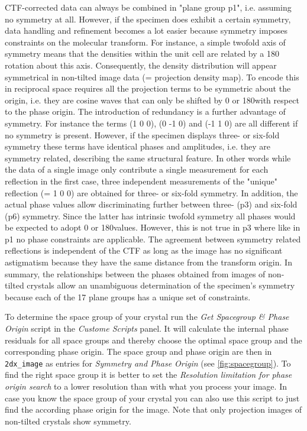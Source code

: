 CTF-corrected data can always be combined in "plane group p1", i.e. assuming no symmetry at all. However, if the specimen does exhibit a certain symmetry, data handling and refinement becomes a lot easier because symmetry imposes constraints on the molecular transform. For instance, a simple twofold axis of symmetry means that the densities within the unit cell are related by a 180\textdegree
rotation about this axis. Consequently, the density distribution will appear symmetrical in non-tilted image data (= projection density map). To encode this in reciprocal space requires all the projection terms to be symmetric about the origin, i.e. they are cosine waves that can only be shifted by 0 or 180\textdegree with respect to the phase origin.
The introduction of redundancy is a further advantage of symmetry. For instance the terms (1 0 0), (0 -1 0) and (-1 1 0) are all different if no symmetry is present. However, if the specimen displays three- or six-fold symmetry these terms have identical phases and amplitudes, i.e. they are symmetry related, describing the same structural feature. In other words while the data of a single image only contribute a single measurement for each reflection in the first case, three independent measurements of the "unique" reflection (= 1 0 0) are obtained for three- or six-fold symmetry. In addition, the actual phase values allow discriminating further between three- (p3) and six-fold (p6) symmetry. Since the latter has intrinsic twofold symmetry all phases would be expected to adopt 0 or 180\textdegree values. However, this is not true in p3 where like in p1 no phase constraints are applicable. The agreement between symmetry related reflections is independent of the CTF as long as the image has no significant astigmatism because they have the same distance from the transform origin. 
In summary, the relationships between the phases obtained from images of non-tilted crystals allow an unambiguous determination of the specimen's symmetry because each of the 17 plane groups has a unique set of constraints. 

To determine the space group of your crystal run the \textit{Get Spacegroup \& Phase Origin}  script in the \textit{Custome Scripts} panel. It will calculate the internal phase residuals for all space groups and thereby choose the optimal space group and the corresponding phase origin. The space group and phase origin are then in \texttt{2dx\_image} as entries for \textit{Symmetry and Phase Origin} (see \autoref{fig:spacegroup}). To find the right space group it is better to set the \textit{Resolution limitation for phase origin search} to a lower resolution than with what you process your image. In case you know the space group of your crystal you can also use this script to just find the according phase origin for the image. Note that only projection images of non-tilted crystals show symmetry.

